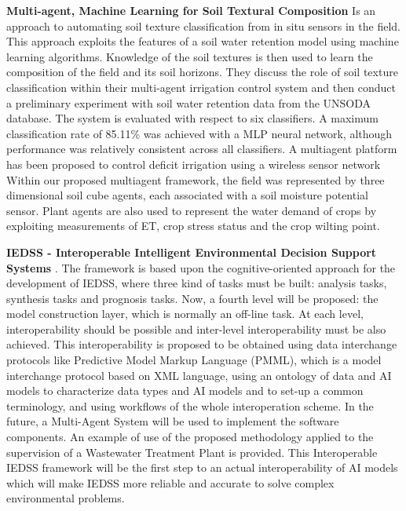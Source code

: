 \documentclass[letterpaper, 10 pt, conference]{ieeeconf}  %
\begin{document}
\textbf{Multi-agent,  Machine  Learning for Soil Textural Composition} \cite{Smith2009} Is an approach to automating  soil texture classification from in situ sensors in the  field. This approach exploits the features of a soil water  retention model using machine learning algorithms. Knowledge  of the soil textures is then used to learn the composition of the field and its soil horizons. They discuss the role of  soil texture classification within their multi-agent  irrigation control system and then conduct a preliminary experiment with soil water retention data from the UNSODA database. The system is  evaluated  with respect to  six classifiers. A maximum classification rate of 85.11\% was achieved with a MLP neural network, although performance was relatively consistent across all classifiers. A multiagent platform has been proposed to control deficit irrigation using a wireless sensor network Within our proposed multiagent framework, the field was represented by three dimensional soil cube agents, each associated with a soil moisture potential sensor. Plant agents are also used to represent the water demand of crops by exploiting measurements of ET, crop stress status and the crop wilting point. 


\textbf{IEDSS - Interoperable Intelligent Environmental Decision Support Systems } \cite{S`anchez-Marr`e2014}. The framework is based upon the cognitive-oriented approach for the development of IEDSS, where three kind of tasks must be built: analysis tasks, synthesis tasks and prognosis tasks. Now, a fourth level will be proposed: the model construction layer, which is normally an off-line task. At each level, interoperability should  be  possible  and  inter-level interoperability  must  be  also  achieved.  This  interoperability  is proposed  to  be  obtained  using  data  interchange  protocols  like  Predictive  Model  Markup  Language (PMML), which is a model interchange protocol based on XML language, using an ontology of data and AI models to characterize data types and AI models and to set-up a common terminology, and using workflows  of  the  whole  interoperation  scheme.  In  the  future,  a  Multi-Agent  System  will  be  used to implement the software components. An example of use of the proposed methodology applied to the supervision of a Wastewater Treatment Plant is provided. This Interoperable IEDSS framework will be the first step to an actual interoperability of AI models which will make IEDSS more reliable and accurate to solve complex environmental problems.
\end{document}
